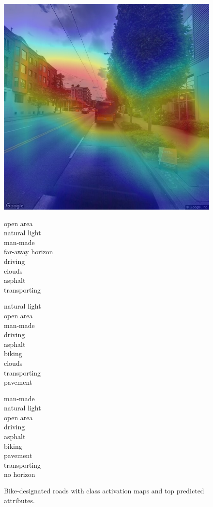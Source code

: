 \documentclass[10pt,twocolumn,letterpaper]{article}
\begin{document}
\begin{figure}[t]
\begin{center}
	\includegraphics[width=0.32\linewidth]{non_bf_cam_3.jpg} 		
\vspace{-0.5cm}
\begin{multicols}{3}
\begin{framed}
open area\\
natural light\\
man-made\\
far-away horizon\\
driving\\
clouds\\
asphalt\\
transporting
\end{framed}
\begin{framed}

natural light\\
open area\\
man-made\\
driving\\
asphalt\\
biking\\
clouds\\
transporting\\
pavement

\end{framed}
\begin{framed}
man-made\\
natural light\\
open area\\
driving\\
asphalt\\
biking\\
pavement\\
transporting\\
no horizon
\end{framed}
\end{multicols}

\end{center}
   \vspace{-0.5cm}
   \caption{Bike-designated roads with class activation maps and top predicted attributes.}
\label{fig:nbf_examples}
\end{figure}
\end{document}
